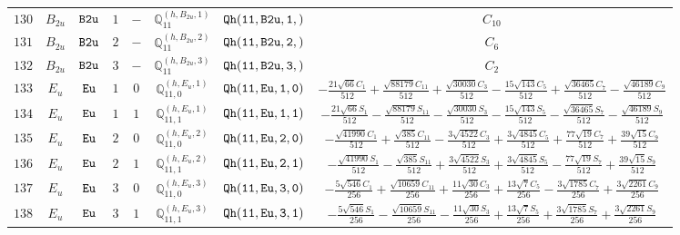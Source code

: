 \documentclass[fleqn,8pt]{jsarticle}
\begin{document}
\begin{table}[ht!]
\begin{center}
\begin{tabular}{cccccccc}
$ 130 $ & $ B_{2u} $ & $ {\tt B2u} $ & $ 1 $ & $ - $ & $ \mathbb{Q}_{11}^{(h,B_{2u},1)} $ & $ {\tt Qh(11,B2u,1,)} $ & $ C_{10} $ \\
$ 131 $ & $ B_{2u} $ & $ {\tt B2u} $ & $ 2 $ & $ - $ & $ \mathbb{Q}_{11}^{(h,B_{2u},2)} $ & $ {\tt Qh(11,B2u,2,)} $ & $ C_{6} $ \\
$ 132 $ & $ B_{2u} $ & $ {\tt B2u} $ & $ 3 $ & $ - $ & $ \mathbb{Q}_{11}^{(h,B_{2u},3)} $ & $ {\tt Qh(11,B2u,3,)} $ & $ C_{2} $ \\
$ 133 $ & $ E_{u} $ & $ {\tt Eu} $ & $ 1 $ & $ 0 $ & $ \mathbb{Q}_{11,0}^{(h,E_{u},1)} $ & $ {\tt Qh(11,Eu,1,0)} $ & $ - \frac{21 \sqrt{66} C_{1}}{512} + \frac{\sqrt{88179} C_{11}}{512} + \frac{\sqrt{30030} C_{3}}{512} - \frac{15 \sqrt{143} C_{5}}{512} + \frac{\sqrt{36465} C_{7}}{512} - \frac{\sqrt{46189} C_{9}}{512} $ \\
$ 134 $ & $ E_{u} $ & $ {\tt Eu} $ & $ 1 $ & $ 1 $ & $ \mathbb{Q}_{11,1}^{(h,E_{u},1)} $ & $ {\tt Qh(11,Eu,1,1)} $ & $ - \frac{21 \sqrt{66} S_{1}}{512} - \frac{\sqrt{88179} S_{11}}{512} - \frac{\sqrt{30030} S_{3}}{512} - \frac{15 \sqrt{143} S_{5}}{512} - \frac{\sqrt{36465} S_{7}}{512} - \frac{\sqrt{46189} S_{9}}{512} $ \\
$ 135 $ & $ E_{u} $ & $ {\tt Eu} $ & $ 2 $ & $ 0 $ & $ \mathbb{Q}_{11,0}^{(h,E_{u},2)} $ & $ {\tt Qh(11,Eu,2,0)} $ & $ - \frac{\sqrt{41990} C_{1}}{512} + \frac{\sqrt{385} C_{11}}{512} - \frac{3 \sqrt{4522} C_{3}}{512} + \frac{3 \sqrt{4845} C_{5}}{512} + \frac{77 \sqrt{19} C_{7}}{512} + \frac{39 \sqrt{15} C_{9}}{512} $ \\
$ 136 $ & $ E_{u} $ & $ {\tt Eu} $ & $ 2 $ & $ 1 $ & $ \mathbb{Q}_{11,1}^{(h,E_{u},2)} $ & $ {\tt Qh(11,Eu,2,1)} $ & $ - \frac{\sqrt{41990} S_{1}}{512} - \frac{\sqrt{385} S_{11}}{512} + \frac{3 \sqrt{4522} S_{3}}{512} + \frac{3 \sqrt{4845} S_{5}}{512} - \frac{77 \sqrt{19} S_{7}}{512} + \frac{39 \sqrt{15} S_{9}}{512} $ \\
$ 137 $ & $ E_{u} $ & $ {\tt Eu} $ & $ 3 $ & $ 0 $ & $ \mathbb{Q}_{11,0}^{(h,E_{u},3)} $ & $ {\tt Qh(11,Eu,3,0)} $ & $ - \frac{5 \sqrt{546} C_{1}}{256} + \frac{\sqrt{10659} C_{11}}{256} + \frac{11 \sqrt{30} C_{3}}{256} + \frac{13 \sqrt{7} C_{5}}{256} - \frac{3 \sqrt{1785} C_{7}}{256} + \frac{3 \sqrt{2261} C_{9}}{256} $ \\
$ 138 $ & $ E_{u} $ & $ {\tt Eu} $ & $ 3 $ & $ 1 $ & $ \mathbb{Q}_{11,1}^{(h,E_{u},3)} $ & $ {\tt Qh(11,Eu,3,1)} $ & $ - \frac{5 \sqrt{546} S_{1}}{256} - \frac{\sqrt{10659} S_{11}}{256} - \frac{11 \sqrt{30} S_{3}}{256} + \frac{13 \sqrt{7} S_{5}}{256} + \frac{3 \sqrt{1785} S_{7}}{256} + \frac{3 \sqrt{2261} S_{9}}{256} $ \\

\end{tabular}
\end{center}
\end{table}
\end{document}
